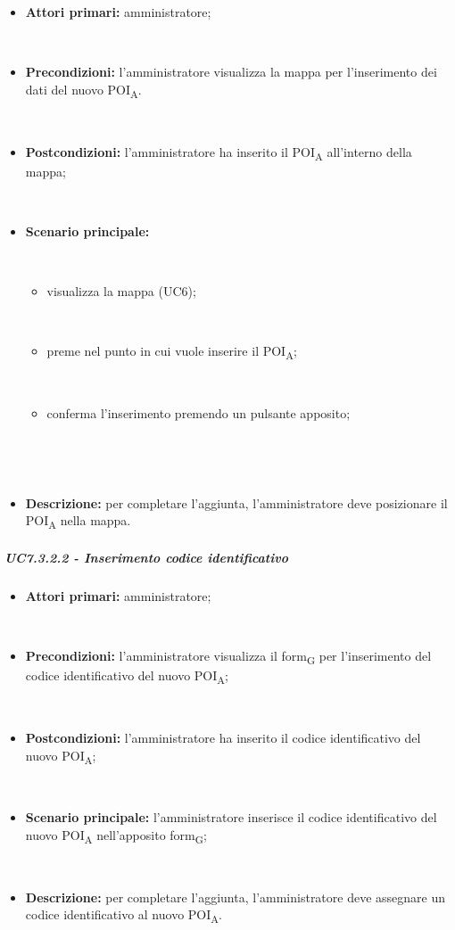 \begin{itemize}

​    \item   \textbf{Attori primari:} amministratore;

​    \item   \textbf{Precondizioni:} l'amministratore visualizza la mappa per l'inserimento dei dati del nuovo POI\textsubscript{A}.

​    \item   \textbf{Postcondizioni:} l'amministratore ha inserito il POI\textsubscript{A} all'interno della mappa; 

​    \item   \textbf{Scenario principale:}

​    \begin{itemize}

​        \item visualizza la mappa (UC6);

​        \item preme nel punto in cui vuole inserire il POI\textsubscript{A};

​        \item conferma l'inserimento premendo un pulsante apposito;

​    \end{itemize}

​    \item   \textbf{Descrizione:} per completare l'aggiunta, l'amministratore deve posizionare il POI\textsubscript{A} nella mappa.



\end{itemize}



\subparagraph{UC7.3.2.2 - Inserimento codice identificativo}

\begin{itemize}

​    \item   \textbf{Attori primari:} amministratore;

​    \item   \textbf{Precondizioni:} l'amministratore visualizza il form\textsubscript{G} per l'inserimento del codice identificativo del nuovo POI\textsubscript{A};

​    \item   \textbf{Postcondizioni:} l'amministratore ha inserito il codice identificativo del nuovo POI\textsubscript{A}; 

​    \item   \textbf{Scenario principale:} l'amministratore inserisce il codice identificativo del nuovo POI\textsubscript{A} nell'apposito form\textsubscript{G};

​    \item   \textbf{Descrizione:} per completare l'aggiunta, l'amministratore deve assegnare un codice identificativo al nuovo POI\textsubscript{A}.



\end{itemize}



